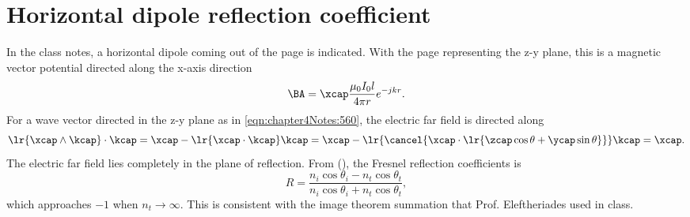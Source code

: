 \section{Horizontal dipole reflection coefficient}
%
In the class notes, a horizontal dipole coming out of the page is indicated.  With the page representing the z-y plane, this is a magnetic vector potential directed along the x-axis direction
%
\begin{equation}\label{eqn:chapter4Notes:640}
\BA = \xcap \frac{\mu_0 I_0 l}{4 \pi r} e^{-j k r}.
\end{equation}
%
For a wave vector directed in the z-y plane as in \cref{eqn:chapter4Notes:560}, the electric far field is directed along
%
\begin{dmath}\label{eqn:chapter4Notes:660}
\lr{ \xcap \wedge \kcap } \cdot \kcap
=
\xcap - \lr{ \xcap \cdot \kcap } \kcap
=
\xcap - \lr{ \cancel{\xcap \cdot \lr{
\zcap \cos\theta + \ycap \sin\theta
}} } \kcap
= \xcap.
\end{dmath}
%
The electric far field lies completely in the plane of reflection.  From \citep{hecht1998hecht} (), the Fresnel reflection coefficients is
%
\begin{dmath}\label{eqn:chapter4Notes:680}
R =
\frac{
n_i \cos\theta_i - n_t \cos\theta_t
}
{
n_i \cos\theta_i + n_t \cos\theta_t
},
\end{dmath}
%
which approaches \( -1 \) when \( n_t \rightarrow \infty \).  This is consistent with the image theorem summation that Prof. Eleftheriades used in class.
%
